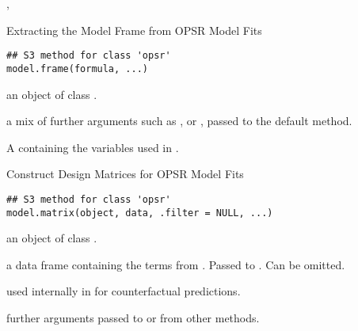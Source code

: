 \documentclass[letterpaper]{book}
\begin{document}
%
\begin{SeeAlso}
, 
\end{SeeAlso}
%
\begin{Description}
Extracting the Model Frame from OPSR Model Fits
\end{Description}
%
\begin{Usage}
\begin{verbatim}
## S3 method for class 'opsr'
model.frame(formula, ...)
\end{verbatim}
\end{Usage}
%
\begin{Arguments}
\begin{ldescription}
\item[\code{formula}] an object of class .

\item[\code{...}] a mix of further arguments such as ,  or ,
passed to the default method.
\end{ldescription}
\end{Arguments}
%
\begin{Value}
A  containing the variables used in .
\end{Value}
%
\begin{SeeAlso}
\end{SeeAlso}
%
\begin{Description}
Construct Design Matrices for OPSR Model Fits
\end{Description}
%
\begin{Usage}
\begin{verbatim}
## S3 method for class 'opsr'
model.matrix(object, data, .filter = NULL, ...)
\end{verbatim}
\end{Usage}
%
\begin{Arguments}
\begin{ldescription}
\item[\code{object}] an object of class .

\item[\code{data}] a data frame containing the terms from . Passed to
. Can be omitted.

\item[\code{.filter}] used internally in  for counterfactual predictions.

\item[\code{...}] further arguments passed to or from other methods.
\end{ldescription}
\end{Arguments}
\end{document}
